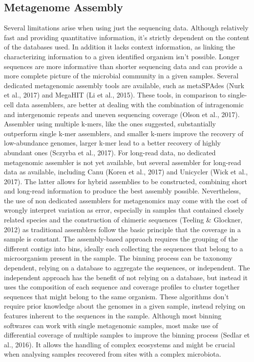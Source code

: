 \subsection{Metagenome Assembly}

Several limitations arise when using just the sequencing data. Although relatively fast and providing quantitative information, it’s strictly dependent on the content of the databases used. In addition it lacks context information, as linking the characterizing information to a given identified organism isn’t possible. 
Longer sequences are more informative than shorter sequencing data and can provide a more complete picture of the microbial community in a given samples. Several dedicated metagenomic assembly tools are available, such as metaSPAdes (Nurk et al., 2017)  and MegaHIT (Li et al., 2015). These tools, in comparison to single-cell data assemblers, are better at dealing with the combination of intragenomic and intergenomic repeats and uneven sequencing coverage (Olson et al., 2017). Assembler using multiple k-mers, like the ones suggested, substantially outperform single k-mer assemblers, and smaller k-mers improve the recovery of low-abundance genomes, larger k-mer lead to a better recovery of highly abundant ones (Sczyrba et al., 2017). 
For long-read data, no dedicated metagenomic assembler is not yet available, but several assembler for long-read data as available, including Canu (Koren et al., 2017) and Unicycler (Wick et al., 2017). The latter allows for hybrid assemblies to be constructed, combining short and long-read information to produce the best assembly possible. Nevertheless, the use of non dedicated assemblers for metagenomics may come with the cost of wrongly interpret variation as error, especially in samples that contained closely related species and the construction of chimeric sequences (Teeling & Glockner, 2012) as traditional assemblers follow the basic principle that the coverage in a sample is constant. 
The assembly-based approach requires the grouping of the different contigs into bins, ideally each collecting the sequences that belong to a microorganism present in the sample. The binning process can be taxonomy dependent, relying on a database to aggregate the sequences, or independent. The independent approach has the benefit of not relying on a database, but instead it uses the composition of each sequence and coverage profiles to cluster together sequences that might belong to the same organism. These algorithms don’t require prior knowledge about the genomes in a given sample, instead relying on features inherent to the sequences in the sample. Although most binning softwares can work with single metagenomic samples, most make use of differential coverage of multiple samples to improve the binning process (Sedlar et al., 2016). It allows the handling of complex ecosystems and might be crucial when analysing samples recovered from sites with a complex microbiota. 
